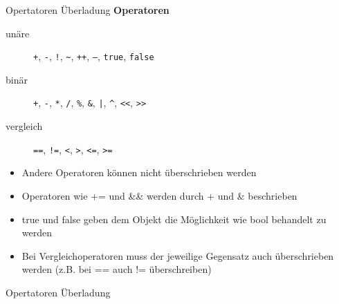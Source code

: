 \begin{frame}{Opertatoren Überladung}
	\textbf{Operatoren}\\
	\begin{description}
		\item[unäre] \alert{\texttt{+}}, \alert{\texttt{-}}, \alert{\texttt{!}}, \alert{\texttt{\~}}, \alert{\texttt{++}}, \alert{\texttt{--}}, \alert{\texttt{true}}, \alert{\texttt{false}}
		\item[binär] \alert{\texttt{+}}, \alert{\texttt{-}}, \alert{\texttt{*}}, \alert{\texttt{/}}, \alert{\texttt{\%}}, \alert{\texttt{\&}}, \alert{\texttt{|}}, \alert{\texttt{\^}}, \alert{\texttt{<<}}, \alert{\texttt{>>}}
		\item[vergleich]  \alert{\texttt{==}}, \alert{\texttt{!=}}, \alert{\texttt{<}}, \alert{\texttt{>}}, \alert{\texttt{<=}}, \alert{\texttt{>=}}
	\end{description}
	\begin{itemize}
		\item Andere Operatoren können nicht überschrieben werden
		\item Operatoren wie \alert{+=} und \alert{\&\&} werden durch \alert{+} und \alert{\&} beschrieben
		\item \alert{true} und \alert{false} geben dem Objekt die Möglichkeit wie bool behandelt zu werden
		\item Bei Vergleichoperatoren muss der jeweilige Gegensatz auch überschrieben werden (z.B. bei \alert{==} auch \alert{!=} überschreiben)
	\end{itemize}
\end{frame}

\begin{frame}{Opertatoren Überladung}
	
	
\end{frame}


